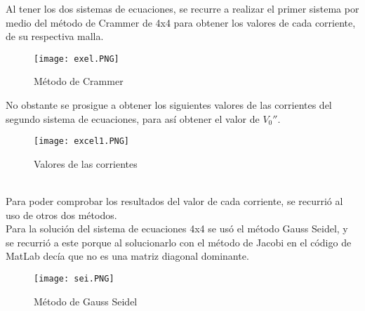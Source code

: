 \documentclass[12pt]{article}
\begin{document}
Al tener los dos sistemas de ecuaciones, se recurre a realizar el primer sistema por medio del método de Crammer de 4x4 para obtener los valores de cada corriente, de su respectiva malla.

\begin{figure}[hbtp]
\caption{Método de Crammer}
\centering
\texttt{[image: exel.PNG]}
\end{figure}
No obstante se prosigue a obtener los siguientes valores de las corrientes del segundo sistema de ecuaciones, para así obtener el valor de $V_0''$.
\begin{figure}[hbtp]
\caption{Valores de las corrientes}
\centering
\texttt{[image: excel1.PNG]}
\end{figure}\\
Para poder comprobar los resultados del valor de cada corriente, se recurrió al uso de otros dos métodos.\\

Para la solución del sistema de ecuaciones 4x4 se usó el método Gauss Seidel, y se recurrió a este porque al solucionarlo con el método de Jacobi en el código de MatLab decía que no es una matriz diagonal dominante.
\begin{figure}[hbtp]
\caption{Método de Gauss Seidel}
\centering
\texttt{[image: sei.PNG]}
\end{figure}
\end{document}
